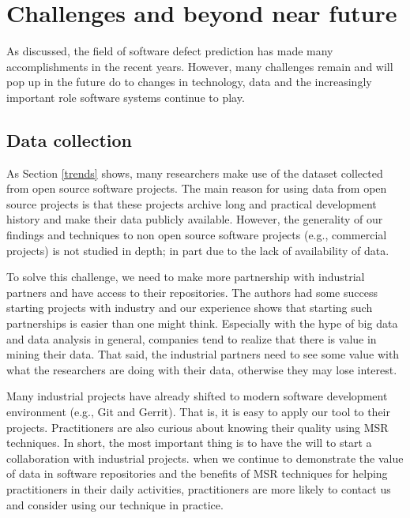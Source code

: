 \section{Challenges and beyond near future} \label{challenges}



As discussed, the field of software defect prediction has made many accomplishments in the recent years. However, many challenges remain and will pop up in the future do to changes in technology, data and the increasingly important role software systems continue to play.

\subsection{Data collection}
As Section \ref{trends} shows, many researchers make use of the dataset collected from open source software projects. The main reason for using data from open source projects is that these projects archive long and practical development history and make their data publicly available. However, the generality of our findings and techniques to non open source software projects (e.g., commercial projects) is not studied in depth; in part due to the lack of availability of data. 

To solve this challenge, we need to make more partnership with industrial partners and have access to their repositories. The authors had some success starting projects with industry and our experience shows that starting such partnerships is easier than one might think. Especially with the hype of big data and data analysis in general, companies tend to realize that there is value in mining their data. That said, the industrial partners need to see some value with what the researchers are doing with their data, otherwise they may lose interest.

Many industrial projects have already shifted to modern software development environment (e.g., Git and Gerrit). That is, it is easy to apply our tool to their projects. Practitioners are also curious about knowing their quality using MSR techniques. 
In short, the most important thing is to have the will to start a collaboration with industrial projects. when we continue to demonstrate the value of data in software repositories and the benefits of MSR techniques for helping practitioners in their daily activities, practitioners are more likely to contact us and consider using our technique in practice. 

